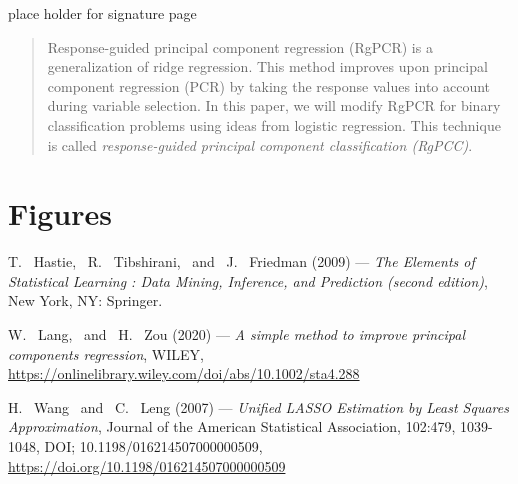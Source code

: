 \documentclass[12pt, english]{article}
\begin{document}
\def\smfbyname{}

 

place holder for signature page
\newpage



\newpage

\tableofcontents
\newpage

\printglossaries
\newpage

\listoffigures
\newpage


\begin{abstract}
	Response-guided principal component regression (RgPCR) is a generalization of ridge regression. This method improves upon principal component regression (PCR) by taking the response values into account during variable selection. In this paper, we will modify RgPCR for binary classification problems using ideas from logistic regression. This technique is called \textit{response-guided principal component classification (RgPCC)}.
\end{abstract}
\newpage


 


 











\section{Figures}


\begin{thebibliography}{99}

 {\sc T. \ Hastie, \ R. \ Tibshirani, \ and \ J. \ Friedman (2009)} ---
 {\it The Elements of Statistical Learning : Data Mining, Inference, and Prediction
 (second edition)}, New York, NY: Springer.

 {\sc W. \ Lang, \ and \ H. \ Zou (2020)} ---
 {\it A simple method to improve principal components regression},
 WILEY, \href{https://onlinelibrary.wiley.com/doi/abs/10.1002/sta4.288}{https://onlinelibrary.wiley.com/doi/abs/10.1002/sta4.288}

 {\sc H. \ Wang \ and \ C. \ Leng (2007)} ---
 {\it Unified LASSO Estimation by Least Squares Approximation},
 Journal of the American Statistical Association, 102:479, 1039-1048, DOI; 10.1198/016214507000000509, \href{https://doi.org/10.1198/016214507000000509}{https://doi.org/10.1198/016214507000000509}

\end{thebibliography}
\end{document}
